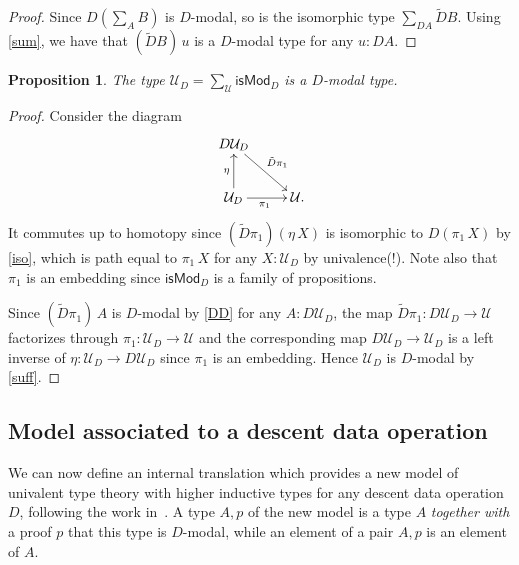 \documentclass[10pt,a4paper,draft]{article}
\newcommand{\UU}{\mathcal{U}}%
\newcommand{\GG}{\mathsf{isMod}}
\newcommand{\inc}{\mathsf{inc}}
\newcommand{\patch}{\mathsf{patch}}
\newcommand{\leftinv}{\mathsf{linv}}
\newcommand{\D}{D}              %
\newcommand{\DD}{\tilde{D}} %
\renewcommand{\~}{\widetilde}
\newcounter{diagram}
\newtheorem{proposition}[theorem]{Proposition}
\theoremstyle{definition}
\theoremstyle{remark} %
\begin{document}
\begin{proof}
  Since $\D(\sum_AB)$ is $\D$\hyp{}modal, so is the isomorphic type
$\sum_{\D A}{\DD B}$.
Using \cref{sum}, we have that $(\DD B)\,u$
is a $\D$\hyp{}modal type for any $u:\D A$.
\end{proof}

\begin{proposition}\label{univ}
The type $\UU_\D = \sum_{\UU}\GG_\D$ is a $\D$\hyp{}modal type.
\end{proposition}

\begin{proof}
  Consider the diagram
\[
\xymatrix{
  \D\UU_\D \ar[dr]^{\DD\pi_1} \\
  \UU_\D \ar[u]^{\eta} \ar[r]_{\pi_1} & \UU \rlap{.}
}
\]
It commutes up to homotopy since $(\DD\pi_1)(\eta\, X)$ is isomorphic to
$\D(\pi_1\, X)$ by \cref{iso}, which
is path equal to $\pi_1\, X$ for any $X:\UU_\D$ by univalence(!). Note also that $\pi_1$
is an embedding since $\GG_\D$ is a family of propositions.

Since $(\DD\pi_1)\, A$ is $\D$\hyp{}modal by \cref{DD} for any $A:\D\UU_\D$,
the map $\DD\pi_1:\D\UU_\D\rightarrow\UU$
factorizes through $\pi_1:\UU_\D\rightarrow\UU$ and the corresponding
map $\D\UU_\D\rightarrow\UU_\D$ is a left inverse of $\eta:\UU_\D\rightarrow \D\UU_\D$
since $\pi_1$ is an embedding. Hence $\UU_\D$ is $\D$\hyp{}modal by \cref{suff}.
\end{proof}

\subsection{Model associated to a descent data operation}

We can now define an internal translation which provides a new model of
univalent type theory with higher inductive types
for any descent data operation $\D$, following the work in~\cite{Quirin16}. A
type $A,p$ of the new model
is a type $A$ {\em together with}
a proof $p$ that this type is $\D$\hyp{}modal, while an element of a pair $A,p$ is an element of $A$.

\end{document}
